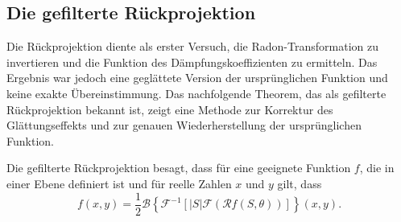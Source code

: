 \subsection{Die gefilterte Rückprojektion
	\label{ct:subsection:gefilterterueck}}
Die Rückprojektion diente als erster Versuch, die Radon-Transformation zu invertieren und die Funktion des Dämpfungskoeffizienten zu ermitteln. Das Ergebnis war jedoch eine geglättete Version der ursprünglichen Funktion und keine exakte Übereinstimmung. Das nachfolgende Theorem, das als gefilterte Rückprojektion bekannt ist, zeigt eine Methode zur Korrektur des Glättungseffekts und zur genauen Wiederherstellung der ursprünglichen Funktion.

Die gefilterte Rückprojektion besagt, dass für eine geeignete Funktion $f$, die in einer Ebene definiert ist und für reelle Zahlen $x$ und $y$ gilt, dass
\begin{equation}
	f(x, y) = \dfrac{1}{2}\mathscr{B}\left\{\mathscr{F}^{-1}[|S|\mathscr{F}(\mathscr{R}f(S, \theta))]\right\}(x,y).
\end{equation}

